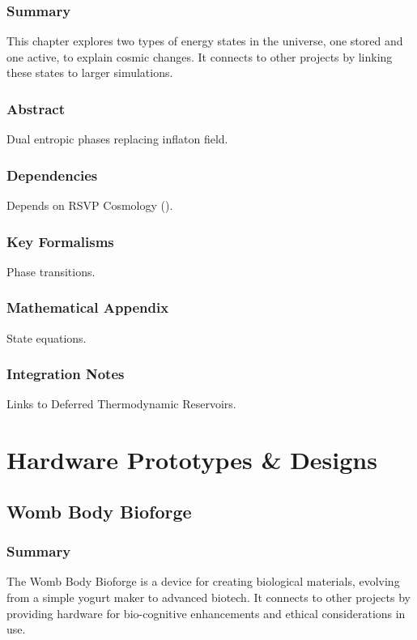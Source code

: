 \documentclass[11pt,oneside]{memoir}
\theoremstyle{plain}
\begin{document}
\section{Summary}
This chapter explores two types of energy states in the universe, one stored and one active, to explain cosmic changes. It connects to other projects by linking these states to larger simulations.

\section{Abstract}
Dual entropic phases replacing inflaton field.

\section{Dependencies}
Depends on RSVP Cosmology ().

\section{Key Formalisms}
Phase transitions.

\section{Mathematical Appendix}
State equations.

\section{Integration Notes}
Links to Deferred Thermodynamic Reservoirs.

\part{Hardware Prototypes \& Designs}

\chapter{Womb Body Bioforge}
\label{sec:womb_bioforge}

\section{Summary}
The Womb Body Bioforge is a device for creating biological materials, evolving from a simple yogurt maker to advanced biotech. It connects to other projects by providing hardware for bio-cognitive enhancements and ethical considerations in use.
\end{document}

